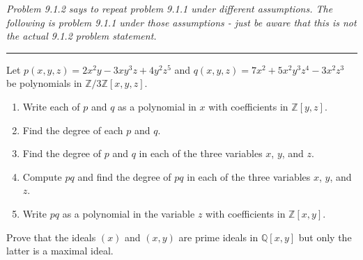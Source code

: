 \documentclass[12pt,letterpaper]{hmcpset}
\newcommand{\Zz}{\mathbb{Z}}
\newcommand{\Qq}{\mathbb{Q}}
\begin{document}
\begin{problem}[9.1.2]
	\textit{Problem 9.1.2 says to repeat problem 9.1.1 under different assumptions. The following is problem 9.1.1 under those assumptions - just be aware that this is not the actual 9.1.2 problem statement.}

	\hrule \vspace*{1mm}

	Let $p(x,y,z)=2x^2y-3xy^3z+4y^2z^5$ and $q(x,y,z)=7x^2+5x^2y^3z^4-3x^2z^3$ be polynomials in $\Zz/3\Zz[x,y,z]$.
	\begin{enumerate}
		\item Write each of $p$ and $q$ as a polynomial in $x$ with coefficients in $\Zz[y,z]$.
		\item Find the degree of each $p$ and $q$.
		\item Find the degree of $p$ and $q$ in each of the three variables $x$, $y$, and $z$.
		\item Compute $pq$ and find the degree of $pq$ in each of the three variables $x$, $y$, and $z$.
		\item Write $pq$ as a polynomial in the variable $z$ with coefficients in $\Zz[x,y]$.
	\end{enumerate}
\end{problem}
\begin{solution}
	\vfill
\end{solution}
\newpage

\begin{problem}[9.1.4]
  Prove that the ideals $(x)$ and $(x,y)$ are prime ideals in $\Qq[x,y]$ but only the latter is a maximal ideal.
\end{problem}
\begin{solution}
	\vfill
\end{solution}
\end{document}

